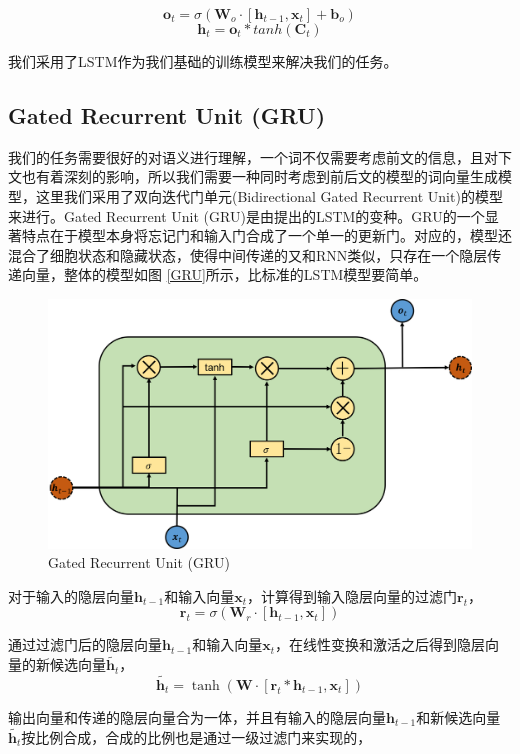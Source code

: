 \documentclass[10pt, titlepage]{article}
\begin{document}
$$ \textbf{o}_t = \sigma (\textbf{W}_o \cdot [\textbf{h}_{t-1},\textbf{x}_t]+\textbf{b}_o) $$
$$ \textbf{h}_t = \textbf{o}_t * tanh(\textbf{C}_t)$$

我们采用了LSTM作为我们基础的训练模型来解决我们的任务。

\subsection{Gated Recurrent Unit (GRU)}

我们的任务需要很好的对语义进行理解，一个词不仅需要考虑前文的信息，且对下文也有着深刻的影响，所以我们需要一种同时考虑到前后文的模型的词向量生成模型，这里我们采用了双向迭代门单元(Bidirectional Gated Recurrent Unit)的模型来进行。Gated Recurrent Unit (GRU)是由\cite{cho2014learning}提出的LSTM的变种。GRU的一个显著特点在于模型本身将忘记门和输入门合成了一个单一的更新门。对应的，模型还混合了细胞状态和隐藏状态，使得中间传递的又和RNN类似，只存在一个隐层传递向量，整体的模型如图 \ref{GRU}所示，比标准的LSTM模型要简单。

		\begin{figure}[htb]
		\centering
		\includegraphics[width=0.9\columnwidth]{figs/GRU.png}
		\caption{Gated Recurrent Unit (GRU)}
		\label{fig:GRU}
		\end{figure}

对于输入的隐层向量$\textbf{h}_{t-1}$和输入向量$\textbf{x}_t$，计算得到输入隐层向量的过滤门$\textbf{r}_t$，
$$\textbf{r}_t = \sigma(\textbf{W}_r \cdot [\textbf{h}_{t-1},\textbf{x}_t])$$

通过过滤门后的隐层向量$\textbf{h}_{t-1}$和输入向量$\textbf{x}_t$，在线性变换和激活之后得到隐层向量的新候选向量$\tilde{\textbf{h}_t}$，
$$\tilde{\textbf{h}_t} = \tanh(\textbf{W} \cdot [\textbf{r}_t * \textbf{h}_{t-1},\textbf{x}_t])$$

输出向量和传递的隐层向量合为一体，并且有输入的隐层向量$\textbf{h}_{t-1}$和新候选向量$\tilde{\textbf{h}_t}$按比例合成，合成的比例也是通过一级过滤门来实现的，
\end{document}
